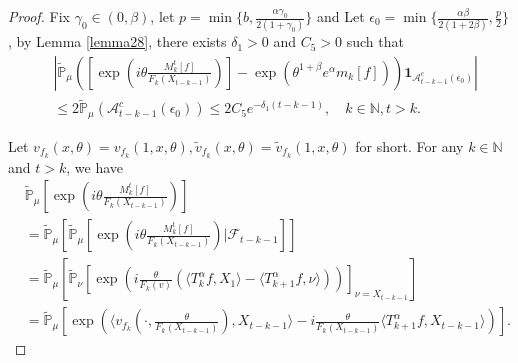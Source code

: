 \documentclass[12pt, a4paper]{amsart}
\theoremstyle{definition}
\numberwithin{equation}{section}
\begin{document}
\begin{proof}
Fix $\gamma_0\in (0,\beta)$, let $p=\min\{b,\frac{\alpha\gamma_0}{2(1+\gamma_0)}\}$ and Let $\epsilon_0=\min\{\frac{\alpha\beta}{2(1+2\beta)},\frac{p}{2}\}$, by Lemma \ref{lemma28}, there exists $\delta_1>0$ and $C_5>0$ such that 
    \begin{align}
    \label{eq:31step0}
        &\left|\mathbb{\tilde{P}}_{\mu}\left([\exp(i\theta \frac {M_k^t[f]}{F_k(X_{t-k-1})})]-\exp(\theta^{1+\beta}e^{\alpha}m_k[f])\right)\mathbf{1}_{\mathcal{A}^c_{t-k-1}(\epsilon_0)}\right|
        \\ &\leq 2\mathbb{\tilde{P}}_{\mu}(\mathcal{A}^c_{t-k-1}(\epsilon_0))
        \leq 2C_5e^{-\delta_1(t-k-1)},\quad k\in \mathbb{N}, t>k.\label{lemma33q}
    \end{align}
    

    Let $v_{f_k}(x,\theta)=v_{f_k}(1,x,\theta),\tilde{v}_{f_k}(x,\theta)=\tilde{v}_{f_k}(1,x,\theta)$ for short. For any $k\in\mathbb{N}$ and $t>k$, we have
    \begin{align*}
        &\mathbb{\tilde{P}}_{\mu}[\exp(i\theta\frac {M_k^t[f]}{F_k(X_{t-k-1})})]\\
        &=\mathbb{\tilde{P}}_{\mu}\left[\mathbb{\tilde{P}}_{\mu}[\exp(i\theta\frac{M_k^t[f]}{F_k(X_{t-k-1})})|\mathcal{F}_{t-k-1}]\right]\\
        &=\mathbb{\tilde{P}}_{\mu}\left[\mathbb{\tilde{P}}_{\nu}\left[\exp\left(i\frac{\theta}{F_k(v)}(\langle T_k^{\alpha}f,X_1\rangle-\langle T_{k+1}^{\alpha}f,\nu\rangle)\right)\right]_{\nu=X_{t-k-1}}\right]\\
        &=\mathbb{\tilde{P}}_{\mu}\left[\exp\left(\langle v_{f_k}(\cdot,\frac{\theta}{F_k(X_{t-k-1})}),X_{t-k-1}\rangle-i\frac{\theta}{F_k(X_{t-k-1})}\langle T_{k+1}^{\alpha}f, X_{t-k-1}\rangle\right)\right].
    \end{align*}


\end{proof}
\end{document}
